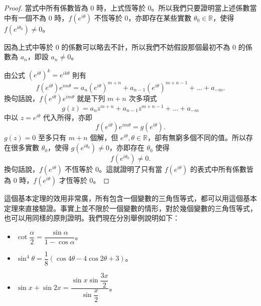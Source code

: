 \begin{proof}
當式中所有係數皆為 $0$ 時，上式恆等於 $0$。所以我們只要證明當上述係數當中有一個不為 $0$ 時，$f(e^{i\theta})$ 不恆等於 $0$，亦即存在某些實數 $\theta_0 \in \mathbb{R}$，使得 $f(e^{i\theta_0}) \neq 0$。

因為上式中等於 $0$ 的係數可以略去不計，所以我們不妨假設那個最初不為 $0$ 的係數為 $a_n$，即設 $a_n \neq 0$。

由公式 $(e^{i\theta})^k = e^{ik\theta}$ 則有
\[
f(e^{i\theta})e^{im\theta} = a_n(e^{i\theta})^{m+n} + a_{n-1}(e^{i\theta})^{m+n-1} + \dots + a_{-m}.
\]
換句話說，$f(e^{i\theta})e^{im\theta}$ 就是下列 $m+n$ 次多項式
\[
g(z) = a_n z^{m+n} + a_{n-1} z^{m+n-1} + \dots + a_{-m}
\]
中以 $z=e^{i\theta}$ 代入所得，亦即
\[
f(e^{i\theta})e^{im\theta} = g(e^{i\theta}).
\]
$g(z)=0$ 至多只有 $m+n$ 個解，但 $e^{i\theta}, \theta \in \mathbb{R}$，卻有無窮多個不同的值。所以存在很多實數 $\theta_0$，使得 $g(e^{i\theta_0}) \neq 0$，亦即存在 $\theta_0$ 使得
\[
f(e^{i\theta_0}) \neq 0.
\]
換句話說，$f(e^{i\theta})$ 不恆等於 $0$。這就證明了只有當 $f(e^{i\theta})$ 的表式中所有係數皆為 $0$ 時，$f(e^{i\theta})$ 才恆等於 $0$。
\end{proof}

這個基本定理的效用非常廣，所有包含一個變數的三角恆等式，都可以用這個基本定理來直接驗證。事實上並不限於一個變數的情形，對於幾個變數的三角恆等式，也可以用同樣的原則證明。我們現在分別舉例說明如下：

\begin{example}
\begin{itemize}
  \item[(i)] $\cot\dfrac{\alpha}{2} = \dfrac{\sin\alpha}{1-\cos\alpha}$。
  \item[(ii)] $\sin^4\theta = \dfrac{1}{8}(\cos 4\theta-4\cos 2\theta+3)$。
  \item[(iii)] $\sin x+\sin 2x = \dfrac{\sin x\sin\dfrac{3x}{2}}{\sin\dfrac{x}{2}}$。
\end{itemize}
\end{example}


